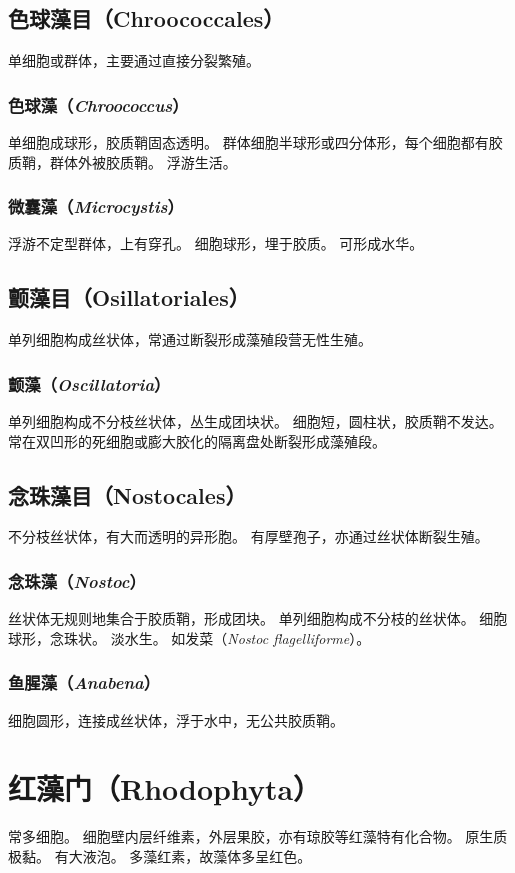 \documentclass[11pt]{article}
\begin{document}
\subsection{色球藻目（Chroococcales）}
单细胞或群体，主要通过直接分裂繁殖。

\subsubsection{色球藻（\textit{Chroococcus}）}
单细胞成球形，胶质鞘固态透明。
群体细胞半球形或四分体形，每个细胞都有胶质鞘，群体外被胶质鞘。
浮游生活。

\subsubsection{微囊藻（\textit{Microcystis}）}
浮游不定型群体，上有穿孔。
细胞球形，埋于胶质。
可形成水华。

\subsection{颤藻目（Osillatoriales）}
单列细胞构成丝状体，常通过断裂形成藻殖段营无性生殖。

\subsubsection{颤藻（\textit{Oscillatoria}）}
单列细胞构成不分枝丝状体，丛生成团块状。
细胞短，圆柱状，胶质鞘不发达。
常在双凹形的死细胞或膨大胶化的隔离盘处断裂形成藻殖段。

\subsection{念珠藻目（Nostocales）}
不分枝丝状体，有大而透明的异形胞。
有厚壁孢子，亦通过丝状体断裂生殖。

\subsubsection{念珠藻（\textit{Nostoc}）}
丝状体无规则地集合于胶质鞘，形成团块。
单列细胞构成不分枝的丝状体。
细胞球形，念珠状。
淡水生。
如发菜（\textit{Nostoc flagelliforme}）。

\subsubsection{鱼腥藻（\textit{Anabena}）}
细胞圆形，连接成丝状体，浮于水中，无公共胶质鞘。

\section{红藻门（Rhodophyta）}
常多细胞。
细胞壁内层纤维素，外层果胶，亦有琼胶等红藻特有化合物。
原生质极黏。
有大液泡。
多藻红素，故藻体多呈红色。
\end{document}
